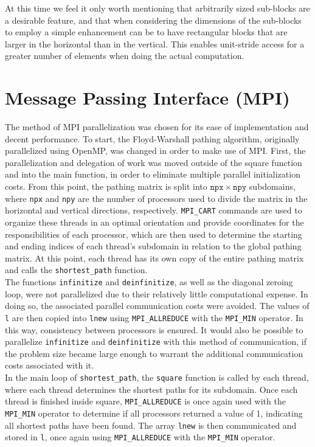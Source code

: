 \documentclass[11pt]{article}
\begin{document}
\noindent At this time we feel it only worth mentioning that arbitrarily sized sub-blocks are a desirable feature, and that when considering the dimensions of the sub-blocks to employ a simple enhancement can be to have rectangular blocks that are larger in the horizontal than in the vertical.  This enables unit-stride access for a greater number of elements when doing the actual computation.

\section{Message Passing Interface (MPI)}

\noindent The method of MPI parallelization was chosen for its ease of implementation and decent performance. To start, the Floyd-Warshall pathing algorithm, originally parallelized using OpenMP, was changed in order to make use of MPI. First, the parallelization and delegation of work was moved outside of the square function and into the main function, in order to eliminate multiple parallel initialization costs. From this point, the pathing matrix is split into $\mathtt{npx}\times \mathtt{npy}$ subdomains, where \texttt{npx} and \texttt{npy} are the number of processors used to divide the matrix in the horizontal and vertical directions, respectively. \texttt{MPI\_CART} commands are used to organize these threads in an optimal orientation and provide coordinates for the responsibilities of each processor, which are then used to determine the starting and ending indices of each thread's subdomain in relation to the global pathing matrix. At this point, each thread has its own copy of the entire pathing matrix and calls the \texttt{shortest\_path} function. \\

\noindent The functions \texttt{infinitize} and \texttt{deinfinitize}, as well as the diagonal zeroing loop, were not parallelized due to their relatively little computational expense. In doing so, the associated parallel communication costs were avoided. The values of \texttt{l} are then copied into \texttt{lnew} using \texttt{MPI\_ALLREDUCE} with the \texttt{MPI\_MIN} operator. In this way, consistency between processors is ensured. It would also be possible to parallelize \texttt{infinitize} and \texttt{deinfinitize} with this method of communication, if the problem size became large enough to warrant the additional communication costs associated with it. \\

\noindent In the main loop of \texttt{shortest\_path}, the \texttt{square} function is called by each thread, where each thread determines the shortest paths for its subdomain. Once each thread is finished inside square, \texttt{MPI\_ALLREDUCE} is once again used with the \texttt{MPI\_MIN} operator to determine if all processors returned a value of 1, indicating all shortest paths have been found. The array \texttt{lnew} is then communicated and stored in \texttt{l}, once again using \texttt{MPI\_ALLREDUCE} with the \texttt{MPI\_MIN} operator. \\
\end{document}
